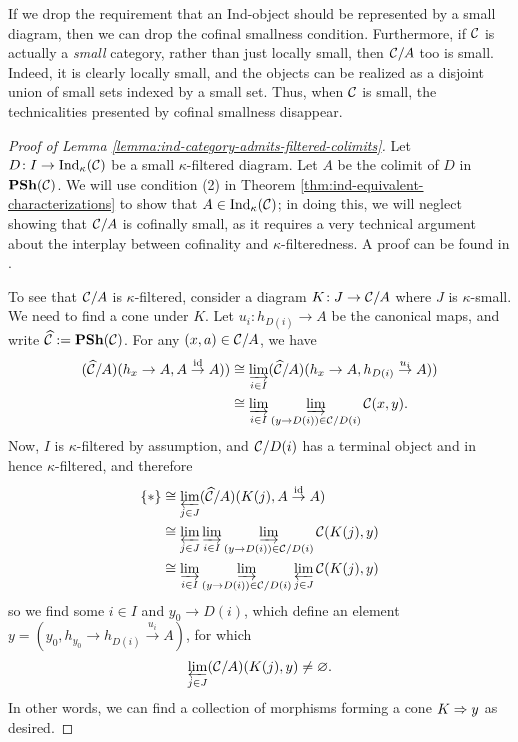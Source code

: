\begin{remark}
	If we drop the requirement that an Ind-object should be represented by a small diagram, then we can drop the cofinal smallness condition. Furthermore, if \(\mathcal{C}\) is
	actually a \emph{small} category, rather than just locally small, then \(\mathcal{C}/A\) too is small. Indeed, it is clearly locally small, and the objects can be realized
	as a disjoint union of small sets indexed by a small set. Thus, when \(\mathcal{C}\) is small, the technicalities presented by cofinal smallness disappear.
\end{remark}

\begin{proof}[Proof of Lemma \ref{lemma:ind-category-admits-filtered-colimits}]
Let \(D\!:I\to\operatorname{Ind}_\kappa(\mathcal{C})\) be a small \(\kappa\)-filtered diagram. Let \(A\) be the colimit of \(D\) in \(\operatorname{\mathbf{PSh}}(\mathcal{C})\).
We will use condition (2) in Theorem \ref{thm:ind-equivalent-characterizations} to show that \(A\in\operatorname{Ind}_\kappa(\mathcal{C})\); in doing this, we will neglect showing that \(\mathcal{C}/A\) is
cofinally small, as it requires a very technical argument about the interplay between cofinality and \(\kappa\)-filteredness. A proof can be found in \cite[Thm.\ 6.1.8]{kashiwara-schapira-book}.

To see that \(\mathcal{C}/A\) is \(\kappa\)-filtered, consider a diagram \(K\!:J\to\mathcal{C}/A\) where \(J\) is \(\kappa\)-small. We need to find a cone under \(K\).
Let \(u_i\!:h_{D(i)}\to A\) be the canonical maps, and write \(\widehat{\mathcal{C}} := \operatorname{\mathbf{PSh}}(\mathcal{C})\). For any \((x,a)\in\mathcal{C}/A\), we have
\begin{align*}
	(\widehat{\mathcal{C}}/A)(h_x\to A,A\overset{\mathrm{id}}\to A)) &\cong \varinjlim_{i\in I}(\widehat{\mathcal{C}}/A)(h_x\to A,h_{D(i)}\overset{u_i}\to A))\\
	&\cong \varinjlim_{i\in I}\varinjlim_{(y\to D(i))\in\mathcal{C}/D(i)}\mathcal{C}(x,y).
\end{align*}
Now, \(I\) is \(\kappa\)-filtered by assumption, and \(\mathcal{C}/D(i)\) has a terminal object and in hence \(\kappa\)-filtered, and therefore
\begin{align*}
	\{*\} &\cong \varprojlim_{j\in J}(\widehat{\mathcal{C}}/A)(K(j),A\overset{\mathrm{id}}\to A) \\
	&\cong \varprojlim_{j\in J}\varinjlim_{i\in I}\varinjlim_{(y\to D(i))\in\mathcal{C}/D(i)}\mathcal{C}(K(j),y) \\
	&\cong \varinjlim_{i\in I}\varinjlim_{(y\to D(i))\in\mathcal{C}/D(i)}\varprojlim_{j\in J}\mathcal{C}(K(j),y) \\
\end{align*}
so we find some \(i\in I\) and \(y_0\to D(i)\), which define an element \(y = (y_0, h_{y_0}\to h_{D(i)}\overset{u_i}\to A)\), for which
\[ \varprojlim_{j\in J}(\mathcal{C}/A)(K(j),y) \not= \varnothing. \]
In other words, we can find a collection of morphisms forming a cone \(K\Rightarrow y\) as desired.
\end{proof}

